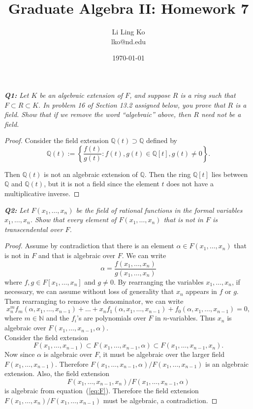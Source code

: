 \documentclass{article}
\begin{document}
\title{Graduate Algebra II: Homework 7}
\author{Li Ling Ko\\ lko@nd.edu}
\date{\today}
\maketitle

\it \textbf{Q1:} Let $K$ be an algebraic extension of $F$, and suppose $R$
  is a ring such that $F\subset R\subset K$. In problem 16 of Section 13.2
  assigned below, you prove that $R$ is a field. Show that if we remove the
  word ``algebraic'' above, then $R$ need not be a field.

  \begin{proof}
    Consider the field extension $\mathbb{Q}(t) \supset \mathbb{Q}$ defined
    by
    \[\mathbb{Q}(t):=\left\{\frac{f(t)}{g(t)}: f(t),g(t)\in\mathbb{Q}[t],
    g(t)\neq0\right\}.\]

    Then $\mathbb{Q}(t)$ is not an algebraic extension of $\mathbb{Q}$.
    Then the ring $\mathbb{Q}[t]$ lies between $\mathbb{Q}$ and
    $\mathbb{Q}(t)$, but it is not a field since the element $t$ does not
    have a multiplicative inverse.
  \end{proof}

\it \textbf{Q2:} Let $F(x_1,\ldots,x_n)$ be the field of rational functions
  in the formal variables $x_1,\ldots,x_n$. Show that every element of
  $F(x_1,\ldots,x_n)$ that is not in $F$ is transcendental over $F$.

  \begin{proof}
    Assume by contradiction that there is an element $\alpha\in
    F(x_1,\ldots,x_n)$ that is not in $F$ and that is algebraic over $F$.
    We can write
    \[\alpha =\frac{f(x_1,\ldots,x_n)} {g(x_1,\ldots,x_n)}\]
    where $f,g\in F[x_1,\ldots,x_n]$ and $g\neq0$.
    By rearranging the variables $x_1,\ldots,x_n$, if necessary, we can
    assume without loss of generality that $x_n$ appears in $f$ or $g$.
    Then rearranging to remove the denominator, we can write
    \begin{equation}
      x_n^mf_m(\alpha,x_1,\ldots,x_{n-1}) +\ldots
      +x_nf_1(\alpha,x_1,\ldots,x_{n-1}) +f_0(\alpha,x_1,\ldots,x_{n-1})
      =0,
      \label{eq:F}
    \end{equation}
    where $m\in\mathbb{N}$ and the $f_i$'s are polynomials over $F$ in
    $n$-variables. Thus $x_n$ is algebraic over
    $F(x_1,\ldots,x_{n-1},\alpha)$. \\

    Consider the field extension
    \[F(x_1,\ldots,x_{n-1}) \subset F(x_1,\ldots,x_{n-1},\alpha) \subset
    F(x_1,\ldots,x_{n-1},x_n).\]
    Now since $\alpha$ is algebraic over $F$, it must be algebraic over the
    larger field $F(x_1,\ldots,x_{n-1})$. Therefore
    $F(x_1,\ldots,x_{n-1},\alpha)/ F(x_1,\ldots,x_{n-1})$ is an algebraic
    extension. Also, the field extension
    \[F(x_1,\ldots,x_{n-1},x_n)/ F(x_1,\ldots,x_{n-1},\alpha)\]
    is algebraic from equation~(\ref{eq:F}).
    Therefore the field extension $F(x_1,\ldots,x_{n})/
    F(x_1,\ldots,x_{n-1})$ must be algebraic, a contradiction.
  \end{proof}
\end{document}
